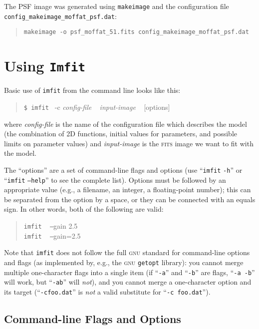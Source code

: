 \documentclass[10pt,a4paper,article]{memoir}
\newcommand{\imfit}{\texttt{imfit}}
\newcommand{\Imfit}{\texttt{Imfit}}
\newcommand{\makeimage}{\texttt{makeimage}}
\begin{document}
The PSF image was generated using \makeimage{} and the configuration
file \\
\texttt{config\_makeimage\_moffat\_psf.dat}:
\begin{quote}
\texttt{makeimage -o psf\_moffat\_51.fits config\_makeimage\_moffat\_psf.dat}
\end{quote}




\chapter{Using \Imfit{}}\label{sec:using-imfit}

Basic use of \imfit{} from the command line looks like this:
\begin{quote}
  \texttt{\$ \imfit{} }  -c \textit{config-file} ~ \textit{input-image} ~ [options]
\end{quote}
where \textit{config-file} is the name of the configuration file
which describes the model (the combination of 2D functions, initial values
for parameters, and possible limits on parameter values) and \textit{input-image}
is the \textsc{fits} image we want to fit with the model.

The ``options'' are a set of command-line flags and options (use ``\imfit{} \texttt{-h}''
or ``\imfit{} \texttt{--help}'' to see the complete list). Options must be followed by
an appropriate value (e.g., a filename, an integer, a floating-point number); this can
be separated from the option by a space, or they can be connected with an equals sign.
In other words, both of the following are valid:
\begin{quote}
\imfit{} ~ \texttt{--}gain 2.5 \\
\imfit{} ~ \texttt{--}gain=2.5
\end{quote}
Note that \imfit{} does not follow the full \textsc{gnu} standard for
command-line options and flags (as implemented by, e.g., the \textsc{gnu}
\texttt{getopt} library): you cannot merge multiple one-character flags
into a single item (if ``\texttt{-a}'' and ``\texttt{-b}'' are flags,
``\texttt{-a -b}'' will work, but ``\texttt{-ab}'' will \textit{not}), and you
cannot merge a one-character option and its target
(``\texttt{-cfoo.dat}'' is \textit{not} a valid substitute for
``\texttt{-c foo.dat}'').


\section{Command-line Flags and Options}\label{sec:imfit-flags}
\end{document}
